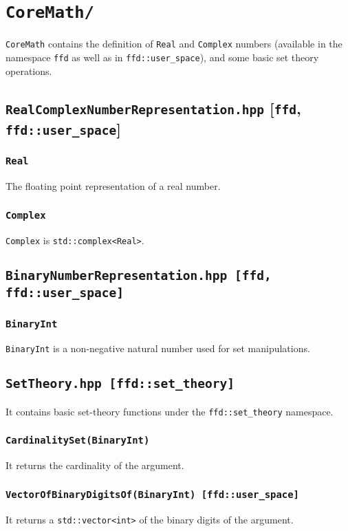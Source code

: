 \chapter{\texttt{CoreMath/}}
\texttt{CoreMath} contains the definition of \texttt{Real} and \texttt{Complex} numbers (available in the namespace \texttt{ffd} as well as in \texttt{ffd::user\_space}), and some basic set theory operations.
\section{\texttt{RealComplexNumberRepresentation.hpp} [\texttt{ffd}, \texttt{ffd::user\_space}]}
\subsection{\texttt{Real}}
The floating point representation of a real number.
\subsection{\texttt{Complex}}
\texttt{Complex} is \texttt{std::complex<Real>}.
\section{\texttt{BinaryNumberRepresentation.hpp [ffd, ffd::user\_space]}}
\subsection{\texttt{BinaryInt}}
\texttt{BinaryInt} is a non-negative natural number used for set manipulations.
\section{\texttt{SetTheory.hpp [ffd::set\_theory]}}
It contains basic set-theory functions under the \texttt{ffd::set\_theory} namespace.
\subsection{\texttt{CardinalitySet(BinaryInt)}}
It returns the cardinality of the argument.
\subsection{\texttt{VectorOfBinaryDigitsOf(BinaryInt) [ffd::user\_space]}}
It returns a \texttt{std::vector<int>} of the binary digits of the argument.
